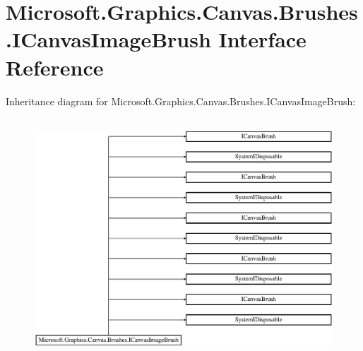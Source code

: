 \hypertarget{interface_microsoft_1_1_graphics_1_1_canvas_1_1_brushes_1_1_i_canvas_image_brush}{}\section{Microsoft.\+Graphics.\+Canvas.\+Brushes.\+I\+Canvas\+Image\+Brush Interface Reference}
\label{interface_microsoft_1_1_graphics_1_1_canvas_1_1_brushes_1_1_i_canvas_image_brush}
Inheritance diagram for Microsoft.\+Graphics.\+Canvas.\+Brushes.\+I\+Canvas\+Image\+Brush\+:\begin{figure}[H]
\begin{center}
\leavevmode
\includegraphics[height=9.032259cm]{interface_microsoft_1_1_graphics_1_1_canvas_1_1_brushes_1_1_i_canvas_image_brush}
\end{center}
\end{figure}
